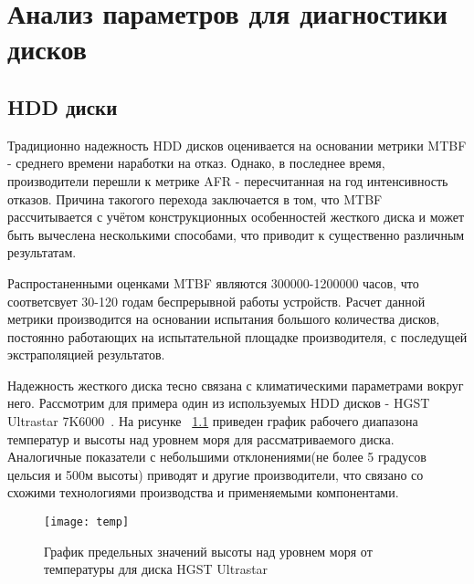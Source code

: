 
\begingroup
\renewcommand{\cleardoublepage}{}
\renewcommand{\clearpage}{}
\vspace{1em}
\chapter{Анализ параметров для диагностики дисков}
\endgroup

\section{HDD диски}
Традиционно надежность HDD дисков оценивается на основании метрики MTBF - среднего времени наработки на отказ. Однако, в последнее время, производители перешли к метрике AFR - пересчитанная на год интенсивность отказов. Причина такогого перехода заключается в том, что MTBF рассчитывается с учётом конструкционных особенностей жесткого диска и может быть вычеслена несколькими способами, что приводит к существенно различным результатам. 

Распростаненными оценками MTBF являются 300000-1200000 часов, что соответсвует 30-120 годам беспрерывной работы устройств. Расчет данной метрики производится на основании испытания большого количества дисков, постоянно работающих на испытательной площадке производителя, с последущей экстраполяцией результатов. 

Надежность жесткого диска тесно связана с климатическими параметрами вокруг него. 
Рассмотрим для примера один из используемых HDD дисков - HGST Ultrastar 7K6000~\cite{HGST}. На рисунке ~\ref{fig:temp} приведен график рабочего диапазона температур и высоты над уровнем моря для рассматриваемого диска. Аналогичные показатели с небольшими отклонениями(не более 5 градусов цельсия и 500м высоты) приводят и другие производители, что связано со схожими технологиями производства и применяемыми компонентами. 

\begin{figure}[!h]
	\centering
	\texttt{[image: temp]}
	\caption{График предельных значений высоты над уровнем моря от температуры для диска HGST Ultrastar}
	\label{fig:temp}
\end{figure}

